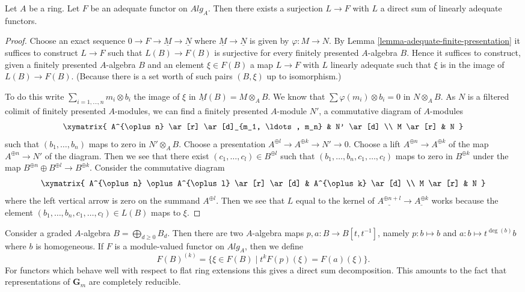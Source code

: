 \begin{lemma}
\label{lemma-adequate-surjection-from-linear}
Let $A$ be a ring.
Let $F$ be an adequate functor on $\textit{Alg}_A$. Then there exists a
surjection $L \to F$ with $L$ a direct sum of linearly adequate functors.
\end{lemma}

\begin{proof}
Choose an exact sequence $0 \to F \to \underline{M} \to \underline{N}$
where $\underline{M} \to \underline{N}$ is given by
$\varphi : M \to N$. By
Lemma \ref{lemma-adequate-finite-presentation}
it suffices to construct $L \to F$ such that $L(B) \to F(B)$ is surjective
for every finitely presented $A$-algebra $B$. Hence it suffices to construct,
given a finitely presented $A$-algebra $B$ and an element $\xi \in F(B)$
a map $L \to F$ with $L$ linearly adequate such that $\xi$ is in the image
of $L(B) \to F(B)$.
(Because there is a set worth of such pairs $(B, \xi)$ up to isomorphism.)

\medskip\noindent
To do this write $\sum_{i = 1, \ldots, n} m_i \otimes b_i$ the image of
$\xi$ in $\underline{M}(B) = M \otimes_A B$. We know that
$\sum \varphi(m_i) \otimes b_i = 0$ in $N \otimes_A B$.
As $N$ is a filtered colimit of finitely presented $A$-modules, we can
find a finitely presented $A$-module $N'$, a commutative diagram
of $A$-modules
$$
\xymatrix{
A^{\oplus n} \ar[r] \ar[d]_{m_1, \ldots, m_n} & N' \ar[d] \\
M \ar[r] & N
}
$$
such that $(b_1, \ldots, b_n)$ maps to zero in $N' \otimes_A B$.
Choose a presentation $A^{\oplus l} \to A^{\oplus k} \to N' \to 0$.
Choose a lift $A^{\oplus n} \to A^{\oplus k}$ of the map
$A^{\oplus n} \to N'$ of the diagram. Then we see that there exist
$(c_1, \ldots, c_l) \in B^{\oplus l}$ such that
$(b_1, \ldots, b_n, c_1, \ldots, c_l)$ maps to zero in $B^{\oplus k}$
under the map $B^{\oplus n} \oplus B^{\oplus l} \to B^{\oplus k}$.
Consider the commutative diagram
$$
\xymatrix{
A^{\oplus n} \oplus A^{\oplus l} \ar[r] \ar[d] & A^{\oplus k} \ar[d] \\
M \ar[r] & N
}
$$
where the left vertical arrow is zero on the summand $A^{\oplus l}$.
Then we see that $L$ equal to the kernel of $\underline{A^{\oplus n + l}}
\to \underline{A^{\oplus k}}$ works because the element
$(b_1, \ldots, b_n, c_1, \ldots, c_l) \in L(B)$ maps to $\xi$.
\end{proof}

\noindent
Consider a graded $A$-algebra $B = \bigoplus_{d \geq 0} B_d$. Then there are
two $A$-algebra maps $p, a : B \to B[t, t^{-1}]$, namely $p : b \mapsto b$ and
$a : b \mapsto t^{\deg(b)} b$ where $b$ is homogeneous. If $F$ is a
module-valued functor on $\textit{Alg}_A$, then we define
\begin{equation}
\label{equation-weight-k}
F(B)^{(k)} = \{\xi \in F(B) \mid t^k F(p)(\xi) = F(a)(\xi)\}.
\end{equation}
For functors which behave well with respect to flat ring extensions
this gives a direct sum decomposition. This amounts to the fact that
representations of $\mathbf{G}_m$ are completely reducible.

